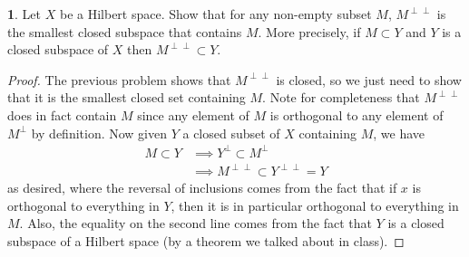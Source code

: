 \documentclass[12pt]{article}
\theoremstyle{definition}
\newtheorem{ex}{}
\begin{document}
\begin{ex}
	Let $X$ be a Hilbert space.
	Show that for any non-empty subset $M$, $M^{\perp\perp}$ is the smallest closed subspace that contains $M$.
	More precisely, if $M \subset Y$ and $Y$ is a closed subspace of $X$ then $M^{\perp\perp} \subset Y$.
\end{ex}
\begin{proof}
	The previous problem shows that $M^{\perp\perp}$ is closed, so we just need to show that it is the smallest closed set containing $M$.
	Note for completeness that $M^{\perp\perp}$ does in fact contain $M$ since any element of $M$ is orthogonal to any element of $M^\perp$ by definition.
	Now given $Y$ a closed subset of $X$ containing $M$, we have \begin{align*}
		M \subset Y & \implies Y^\perp \subset M^\perp \\
                & \implies M^{\perp\perp} \subset Y^{\perp\perp} = Y
	\end{align*}
  as desired, where the reversal of inclusions comes from the fact that if $x$ is orthogonal to everything in $Y$, then it is in particular orthogonal to everything in $M$.
  Also, the equality on the second line comes from the fact that $Y$ is a closed subspace of a Hilbert space (by a theorem we talked about in class).
\end{proof}
\end{document}

